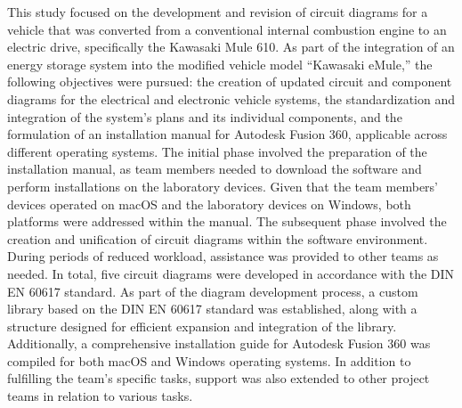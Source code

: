 This study focused on the development and revision of circuit diagrams for a vehicle that was converted from a conventional internal combustion engine to an electric drive, specifically the Kawasaki Mule 610. As part of the integration of an energy storage system into the modified vehicle model “Kawasaki eMule,” the following objectives were pursued: the creation of updated circuit and component diagrams for the electrical and electronic vehicle systems, the standardization and integration of the system’s plans and its individual components, and the formulation of an installation manual for Autodesk Fusion 360, applicable across different operating systems. \newline The initial phase involved the preparation of the installation manual, as team members needed to download the software and perform installations on the laboratory devices. Given that the team members’ devices operated on macOS and the laboratory devices on Windows, both platforms were addressed within the manual. The subsequent phase involved the creation and unification of circuit diagrams within the software environment. During periods of reduced workload, assistance was provided to other teams as needed. \newline In total, five circuit diagrams were developed in accordance with the DIN EN 60617 standard. As part of the diagram development process, a custom library based on the DIN EN 60617 standard was established, along with a structure designed for efficient expansion and integration of the library. Additionally, a comprehensive installation guide for Autodesk Fusion 360 was compiled for both macOS and Windows operating systems. In addition to fulfilling the team’s specific tasks, support was also extended to other project teams in relation to various tasks.

\clearpage